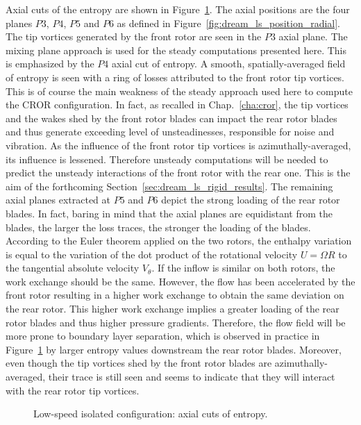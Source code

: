 Axial cuts of the entropy are shown in Figure~\ref{fig:dream_ls_steady_entropy}.
The axial positions are the four planes $P3$, $P4$, $P5$
and $P6$ as defined in Figure~\ref{fig:dream_ls_position_radial}.
The tip vortices generated by the front rotor are seen in the $P3$
axial plane. The mixing plane approach is used for the steady computations
presented here. This is emphasized by the $P4$ axial cut of entropy. A
smooth, spatially-averaged field of entropy is seen with a 
ring of losses attributed to the front rotor tip vortices. This is of course the main
weakness of the steady approach used here to compute the CROR configuration.
In fact, as recalled in Chap.~\ref{cha:cror}, the tip vortices and the wakes shed by the
front rotor blades can impact the rear rotor blades and thus generate
exceeding level of unsteadinesses, responsible for noise and vibration. As the influence
of the front rotor tip vortices is azimuthally-averaged, its influence is
lessened. Therefore unsteady computations will be needed to
predict the unsteady interactions of the front rotor with the rear one.
This is the aim of the forthcoming Section~\ref{sec:dream_ls_rigid_results}.
The remaining axial planes extracted at $P5$ and $P6$ depict the strong loading
of the rear rotor blades. In fact, baring in mind that the
axial planes are equidistant from the blades, the larger the loss traces,
the stronger the loading of the blades. 
According to the Euler theorem applied on the two
rotors, the enthalpy variation is equal to the variation of 
the dot product of the rotational 
velocity $U=\Omega R$ to the tangential absolute velocity
$V_\theta$. If the inflow is similar on both rotors,
the work exchange should be the same. However,
the flow has been accelerated by the front rotor
resulting in a higher work exchange to obtain
the same deviation on the rear rotor.
This higher work exchange implies 
a greater loading of the rear rotor blades and thus
higher pressure gradients. Therefore,
the flow field will be more prone to boundary layer
separation, which is observed in practice in 
Figure~\ref{fig:dream_ls_steady_entropy} by larger entropy
values downstream the rear rotor blades.
Moreover, even though the
tip vortices shed by the front rotor 
blades are azimuthally-averaged,
their trace is still seen and seems to indicate that they will
interact with the rear rotor tip vortices.
\begin{figure}[htp]
  \centering
  \caption{Low-speed isolated configuration: axial cuts of entropy.}
   \label{fig:dream_ls_steady_entropy}
\end{figure}